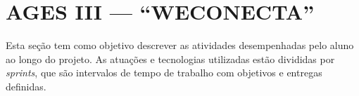 \chapter[AGES III --- “WECONECTA”]{AGES III --- “WECONECTA”}

Esta seção tem como objetivo descrever as atividades desempenhadas pelo
aluno ao longo do projeto. As atuações e tecnologias utilizadas estão divididas por
\textit{sprints}, que são intervalos de tempo de trabalho com objetivos e entregas definidas.




